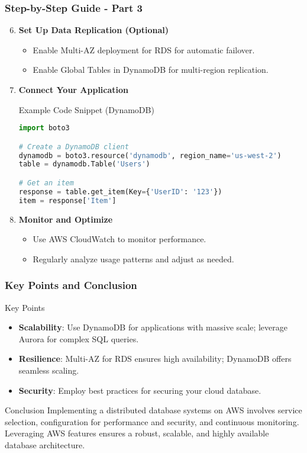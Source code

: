 \documentclass[aspectratio=169]{beamer}
\begin{document}
\begin{frame}[fragile]
    \frametitle{Step-by-Step Guide - Part 3}
    \begin{enumerate}
        \setcounter{enumi}{5}  %
        \item \textbf{Set Up Data Replication (Optional)}
            \begin{itemize}
                \item Enable Multi-AZ deployment for RDS for automatic failover.
                \item Enable Global Tables in DynamoDB for multi-region replication.
            \end{itemize}
        \item \textbf{Connect Your Application}
            \begin{block}{Example Code Snippet (DynamoDB)}
                \begin{lstlisting}[language=Python]
import boto3

# Create a DynamoDB client
dynamodb = boto3.resource('dynamodb', region_name='us-west-2')
table = dynamodb.Table('Users')

# Get an item
response = table.get_item(Key={'UserID': '123'})
item = response['Item']
                \end{lstlisting}
            \end{block}
        \item \textbf{Monitor and Optimize}
            \begin{itemize}
                \item Use AWS CloudWatch to monitor performance.
                \item Regularly analyze usage patterns and adjust as needed.
            \end{itemize}
    \end{enumerate}
\end{frame}

\begin{frame}[fragile]
    \frametitle{Key Points and Conclusion}
    \begin{block}{Key Points}
        \begin{itemize}
            \item \textbf{Scalability}: Use DynamoDB for applications with massive scale; leverage Aurora for complex SQL queries.
            \item \textbf{Resilience}: Multi-AZ for RDS ensures high availability; DynamoDB offers seamless scaling.
            \item \textbf{Security}: Employ best practices for securing your cloud database.
        \end{itemize}
    \end{block}
    \begin{block}{Conclusion}
        Implementing a distributed database systems on AWS involves service selection, configuration for performance and security, and continuous monitoring. Leveraging AWS features ensures a robust, scalable, and highly available database architecture.
    \end{block}
\end{frame}
\end{document}
